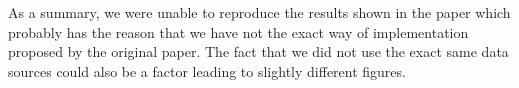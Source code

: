 As a summary, we were unable to reproduce the results shown in the paper which probably has the reason that we have not the exact way of implementation proposed by the original paper. The fact that we did not use the exact same data sources could also be a factor leading to slightly different figures.
